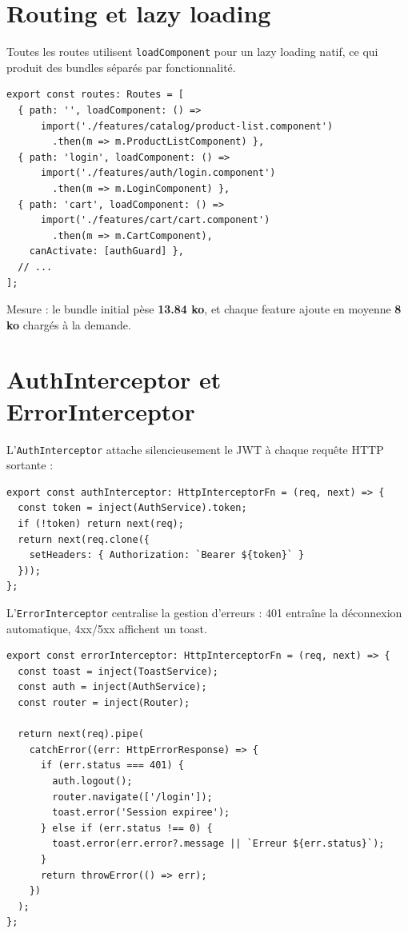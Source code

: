 \documentclass[11pt,a4paper,oneside]{report}
\begin{document}
\section{Routing et lazy loading}

Toutes les routes utilisent \texttt{loadComponent} pour un lazy loading
natif, ce qui produit des bundles séparés par fonctionnalité.

\begin{lstlisting}[style=tsstyle, caption=app.routes.ts]
export const routes: Routes = [
  { path: '', loadComponent: () =>
      import('./features/catalog/product-list.component')
        .then(m => m.ProductListComponent) },
  { path: 'login', loadComponent: () =>
      import('./features/auth/login.component')
        .then(m => m.LoginComponent) },
  { path: 'cart', loadComponent: () =>
      import('./features/cart/cart.component')
        .then(m => m.CartComponent),
    canActivate: [authGuard] },
  // ...
];
\end{lstlisting}

Mesure : le bundle initial pèse \textbf{13.84 ko}, et chaque feature ajoute
en moyenne \textbf{8 ko} chargés à la demande.

\section{AuthInterceptor et ErrorInterceptor}

L'\texttt{AuthInterceptor} attache silencieusement le JWT à chaque requête
HTTP sortante :

\begin{lstlisting}[style=tsstyle]
export const authInterceptor: HttpInterceptorFn = (req, next) => {
  const token = inject(AuthService).token;
  if (!token) return next(req);
  return next(req.clone({
    setHeaders: { Authorization: `Bearer ${token}` }
  }));
};
\end{lstlisting}

L'\texttt{ErrorInterceptor} centralise la gestion d'erreurs :
401 entraîne la déconnexion automatique, 4xx/5xx affichent un toast.

\begin{lstlisting}[style=tsstyle]
export const errorInterceptor: HttpInterceptorFn = (req, next) => {
  const toast = inject(ToastService);
  const auth = inject(AuthService);
  const router = inject(Router);

  return next(req).pipe(
    catchError((err: HttpErrorResponse) => {
      if (err.status === 401) {
        auth.logout();
        router.navigate(['/login']);
        toast.error('Session expiree');
      } else if (err.status !== 0) {
        toast.error(err.error?.message || `Erreur ${err.status}`);
      }
      return throwError(() => err);
    })
  );
};
\end{lstlisting}
\end{document}
